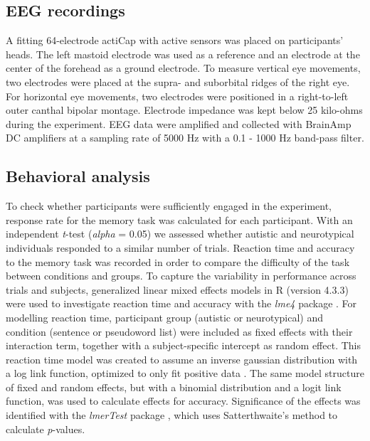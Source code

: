 \subsection{EEG recordings}
A fitting 64-electrode actiCap with active sensors was placed on participants' heads. The left mastoid electrode was used as a reference and an electrode at the center of the forehead as a ground electrode. To measure vertical eye movements, two electrodes were placed at the supra- and suborbital ridges of the right eye. For horizontal eye movements, two electrodes were positioned in a right-to-left outer canthal bipolar montage. Electrode impedance was kept below 25 kilo-ohms during the experiment. EEG data were amplified and collected with BrainAmp DC amplifiers at a sampling rate of 5000 Hz with a 0.1 - 1000 Hz band-pass filter. 

\subsection{Behavioral analysis}
To check whether participants were sufficiently engaged in the experiment, response rate for the memory task was calculated for each participant. With an independent \textit{t}-test (\textit{alpha} = 0.05) we assessed whether autistic and neurotypical individuals responded to a similar number of trials. Reaction time and accuracy to the memory task was recorded in order to compare the difficulty of the task between conditions and groups. To capture the variability in performance across trials and subjects, generalized linear mixed effects models in R (version 4.3.3) were used to investigate reaction time and accuracy with the \textit{lme4} package \citep{bates2015}. For modelling reaction time, participant group (autistic or neurotypical) and condition (sentence or pseudoword list) were included as fixed effects with their interaction term, together with a subject-specific intercept as random effect. This reaction time model was created to assume an inverse gaussian distribution with a log link function, optimized to only fit positive data \citep{lo2015}. The same model structure of fixed and random effects, but with a binomial distribution and a logit link function, was used to calculate effects for accuracy. Significance of the effects was identified with the \textit{lmerTest} package \citep{kuznetsova2017}, which uses Satterthwaite's method to calculate \textit{p}-values.

